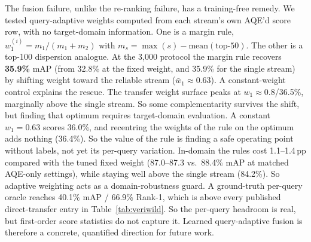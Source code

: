 The fusion failure, unlike the re-ranking failure, has a training-free remedy. We tested query-adaptive weights computed from each stream's own AQE'd score row, with no target-domain information. One is a margin rule, $w_1^{(i)}{=}m_1/(m_1{+}m_2)$ with $m_s{=}\max(s)-\mathrm{mean}(\text{top-}50)$. The other is a top-100 dispersion analogue. At the 3{,}000 protocol the margin rule recovers \textbf{35.9\%} mAP (from 32.8\% at the fixed weight, and 35.9\% for the single stream) by shifting weight toward the reliable stream ($\bar{w}_1{\approx}0.63$). A constant-weight control explains the rescue. The transfer weight surface peaks at $w_1{\approx}0.8$/36.5\%, marginally above the single stream. So some complementarity survives the shift, but finding that optimum requires target-domain evaluation. A constant $w_1{=}0.63$ scores 36.0\%, and recentring the weights of the rule on the optimum adds nothing (36.4\%). So the value of the rule is finding a safe operating point without labels, not yet its per-query variation. In-domain the rules cost 1.1--1.4\,pp compared with the tuned fixed weight (87.0--87.3 vs.\ 88.4\% mAP at matched AQE-only settings), while staying well above the single stream (84.2\%). So adaptive weighting acts as a domain-robustness guard. A ground-truth per-query oracle reaches 40.1\% mAP / 66.9\% Rank-1, which is above every published direct-transfer entry in Table~\ref{tab:veriwild}. So the per-query headroom is real, but first-order score statistics do not capture it. Learned query-adaptive fusion is therefore a concrete, quantified direction for future work.
